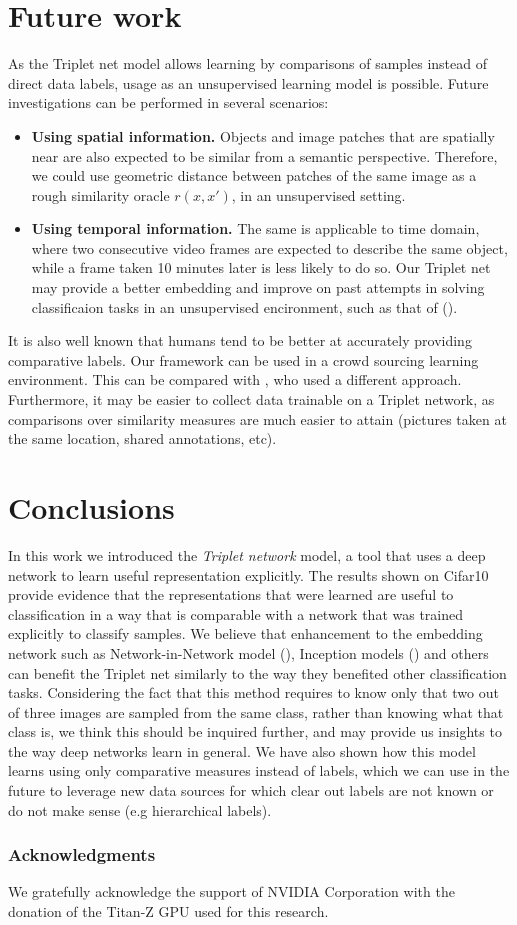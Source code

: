 \documentclass{article} %
\begin{document}
\section{Future work}
As the Triplet net model allows learning by comparisons of samples instead of direct data labels, usage as an unsupervised learning model is possible.
Future investigations can be performed in several scenarios:
\begin{itemize}
 \item {\bf Using spatial information. }Objects and image patches that are spatially near are also expected to be similar from a semantic perspective. Therefore, we could use geometric distance between patches of the same image as a rough similarity oracle $r(x,x')$, in an unsupervised setting.  
\item {\bf Using temporal information.} The same is applicable to time domain, where two consecutive video frames are expected to describe the same object, while a frame taken 10 minutes later is less likely to do so.
Our Triplet net may provide a better embedding and improve on past attempts in solving classificaion
tasks in an unsupervised encironment, such as that of (\citet{mobahi2009deep}).
\end{itemize}
It is also well known that humans tend to be better at accurately providing comparative labels. Our framework can be used in a crowd sourcing learning environment. This can be compared with \citet{shamir}, who used a different approach.
Furthermore, it may be easier to collect data trainable on a Triplet network, as comparisons over similarity measures are much easier to attain (pictures taken at the same location, shared annotations, etc).

\section{Conclusions}
In this work we introduced the \emph{Triplet network} model, a tool that uses a deep network to learn useful representation explicitly.
The results shown on Cifar10 provide evidence that the representations that were learned are useful to classification in a way that is comparable with a network that was trained explicitly to classify samples. We believe that enhancement to the embedding network
such as Network-in-Network model (\citet{LinCY13}), Inception models (\citet{inception}) and others can benefit the Triplet net similarly to the way they benefited other classification tasks.
Considering the fact that this method requires to know only that two out of three images are sampled from the same class, rather than knowing what that class is, we think this should be inquired further, and may provide us insights
to the way deep networks learn in general.
We have also shown how this model learns using only comparative measures instead of labels, which we can use in the future to leverage new data sources for which clear out labels are not known or do not make sense (e.g hierarchical labels).
\subsubsection*{Acknowledgments}

We gratefully acknowledge the support of NVIDIA Corporation with the donation of the Titan-Z GPU used for this research.



\end{document}
